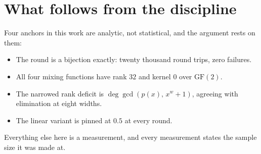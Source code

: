 \section{What follows from the discipline}

Four anchors in this work are analytic, not statistical, and the argument rests on them:

\begin{itemize}
  \item The round is a bijection exactly: twenty thousand round trips, zero failures.
  \item All four mixing functions have rank \(32\) and kernel \(0\) over \(\mathrm{GF}(2)\).
  \item The narrowed rank deficit is \(\deg \gcd(p(x),\, x^w + 1)\), agreeing with elimination at eight widths.
  \item The linear variant is pinned at \(0.5\) at every round.
\end{itemize}

Everything else here is a measurement, and every measurement states the sample size it was made at.
